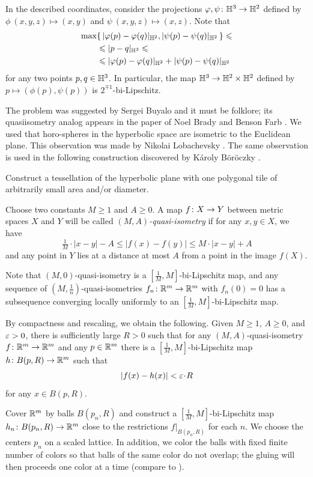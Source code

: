 In the described coordinates, consider the projections $\varphi,\psi\colon\mathbb{H}^3\to\mathbb{H}^2$ defined by 
$\phi\:(x,y,z)\mapsto (x,y)$ and $\psi\:(x,y,z)\mapsto (x,z)$.
Note that 
\begin{align*}
\max&\{\,|\varphi(p)-\varphi(q)|_{\mathbb{H}^2},|\psi(p)-\psi(q)|_{\mathbb{H}^2}\,\}
\leqslant
\\
&\leqslant
|p-q|_{\mathbb{H}^3}
\leqslant
\\
&\leqslant
|\varphi(p)-\varphi(q)|_{\mathbb{H}^2}+ |\psi(p)-\psi(q)|_{\mathbb{H}^2}
\end{align*}
for any two points $p,q\in \mathbb{H}^3$.
In particular, the map $\mathbb{H}^3\to\mathbb{H}^2\times\mathbb{H}^2$ defined by $p\mapsto (\phi(p),\psi(p))$
is $2^{\mp1}$-bi-Lipschitz.\qeds

The problem was suggested by Sergei Buyalo and it must be folklore;
its quasiisometry analog appears in the paper of Noel Brady and Benson Farb \cite{brady-farb}.
We used that horo-spheres in the hyperbolic space are isometric to the Euclidean plane.
This observation was made by Nikolai Lobachevsky \cite[§ 34]{lobachevsky}.
The same observation is used in the following construction discovered by 
Károly Böröczky \cite{boroczky,radin}.

\begin{pr}
Construct a tessellation of the hyperbolic plane with one polygonal tile of arbitrarily small area and/or diameter.
\end{pr}

Choose two constants $M\ge 1$ and $A\ge 0$.
A map $f\:X\z\to Y$ between metric spaces $X$ and $Y$ will be called \emph{$(M,A)$-quasi-isometry}
if for any $x,y\in X$, we have
\[\tfrac1M\cdot |x-y|-A\le |f(x)-f(y)|\le M\cdot |x-y|+A\]
and any point in $Y$ lies at a distance at most $A$ from a point in the image $f(X)$.


Note that $(M,0)$-quasi-isometry is a $[\tfrac1M,M]$-bi-Lipschitz map, and
any sequence of $(M,\tfrac1n)$-quasi-isometries
$f_n\colon\mathbb{R}^m\to\mathbb{R}^m$ with $f_n(0)=0$ has a subsequence
converging locally uniformly to an $[\tfrac1M,M]$-bi-Lipschitz map.

By compactness and rescaling, we obtain the following.
Given $M\ge 1$, $A\ge 0$, and $\varepsilon>0$,
there is sufficiently large $R>0$ such that for any $(M,A)$-quasi-isometry 
$f\colon\mathbb{R}^m\to\mathbb{R}^m$ and any $p\in\mathbb{R}^m$ there is a $[\tfrac1M,M]$-bi-Lipschitz map $h\colon B(p,R)\to \mathbb{R}^m$
such that 
\[|f(x)-h(x)|<\eps\cdot R\]
for any $x\in B(p,R)$.

Cover $\mathbb{R}^m$ by balls $B(p_n,R)$ and construct a $[\tfrac1M,M]$-bi-Lipschitz map $h_n\colon B(p_n,R)\to \mathbb{R}^m$ close to the restrictions $f|_{B(p_n,R)}$ for each $n$.
We choose the centers $p_n$ on a scaled lattice.
In addition, we color the balls with fixed finite number of colors so that balls of the same color do not overlap; the gluing will then proceeds one color at a time (compare to \cite[7.2--7.10]{tukia-vaisala}).

